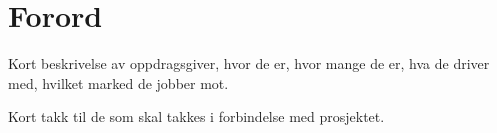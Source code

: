 \chapter*{Forord}
\label{forord}

Kort beskrivelse av oppdragsgiver, hvor de er, hvor mange de er, hva de driver med, hvilket marked de jobber mot.

Kort takk til de som skal takkes i forbindelse med prosjektet.